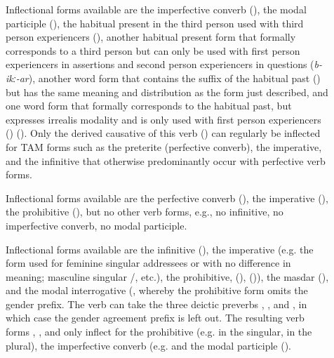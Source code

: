 \begin{description}
\item[ ]
		Inflectional forms available are the imperfective converb (), the modal participle (), the habitual present in the third person used with third person experiencers (), another habitual present form that formally corresponds to a third person but can only be used with first person experiencers in assertions and second person experiencers in questions (\textit{b-ikː-ar}), another word form that contains the suffix of the habitual past () but has the same meaning and distribution as the form just described, and one word form that formally corresponds to the habitual past, but expresses irrealis modality and is only used with first person experiencers () (). Only the derived causative of this verb () can regularly be inflected for TAM forms such as the preterite (perfective converb), the imperative, and the infinitive that otherwise predominantly occur with perfective verb forms.

\item[ ]
		Inflectional forms available are the perfective converb (), the imperative (), the prohibitive (), but no other verb forms, e.g., no infinitive, no imperfective converb, no modal participle.
		
\item[ ]
		Inflectional forms available are the infinitive (), the imperative (e.g. the form used for feminine singular addressees  or  with no difference in meaning; masculine singular \slash{}, etc.), the prohibitive,  (),  ()), the masdar (), and the modal interrogative (, whereby the prohibitive form omits the gender prefix. The verb can take the three deictic preverbs , , and , in which case the gender agreement prefix is left out. The resulting verb forms , , and  only inflect for the prohibitive (e.g.  in the singular,  in the plural), the imperfective converb (e.g.  and the modal participle ().
\end{description}

